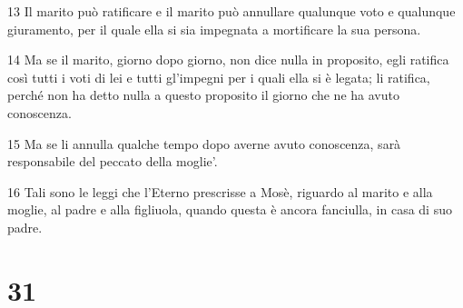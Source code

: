 \par 13 Il marito può ratificare e il marito può annullare qualunque voto e qualunque giuramento, per il quale ella si sia impegnata a mortificare la sua persona.
\par 14 Ma se il marito, giorno dopo giorno, non dice nulla in proposito, egli ratifica così tutti i voti di lei e tutti gl'impegni per i quali ella si è legata; li ratifica, perché non ha detto nulla a questo proposito il giorno che ne ha avuto conoscenza.
\par 15 Ma se li annulla qualche tempo dopo averne avuto conoscenza, sarà responsabile del peccato della moglie'.
\par 16 Tali sono le leggi che l'Eterno prescrisse a Mosè, riguardo al marito e alla moglie, al padre e alla figliuola, quando questa è ancora fanciulla, in casa di suo padre.

\chapter{31}


